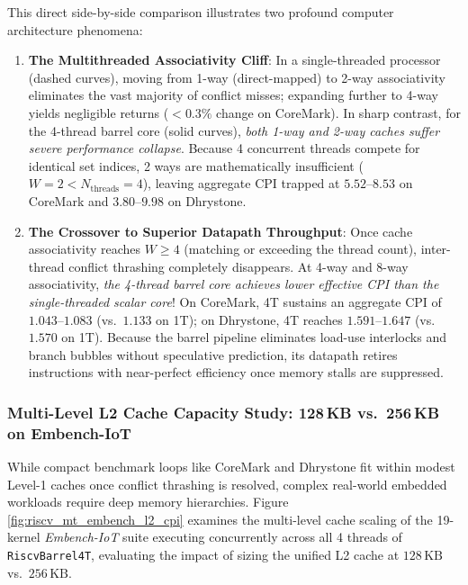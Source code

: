 This direct side-by-side comparison illustrates two profound computer architecture phenomena:
\begin{enumerate}
    \item \textbf{The Multithreaded Associativity Cliff}:
    In a single-threaded processor (dashed curves), moving from 1-way (direct-mapped) to 2-way associativity eliminates the vast majority of conflict misses; expanding further to 4-way yields negligible returns ($<0.3\%$ change on CoreMark). In sharp contrast, for the 4-thread barrel core (solid curves), \textit{both 1-way and 2-way caches suffer severe performance collapse}. Because 4 concurrent threads compete for identical set indices, 2 ways are mathematically insufficient ($W = 2 < N_{\text{threads}} = 4$), leaving aggregate CPI trapped at $5.52\text{--}8.53$ on CoreMark and $3.80\text{--}9.98$ on Dhrystone.
    \item \textbf{The Crossover to Superior Datapath Throughput}:
    Once cache associativity reaches $W \ge 4$ (matching or exceeding the thread count), inter-thread conflict thrashing completely disappears. At 4-way and 8-way associativity, \textit{the 4-thread barrel core achieves lower effective CPI than the single-threaded scalar core}! On CoreMark, 4T sustains an aggregate CPI of $\mathbf{1.043\text{--}1.083}$ (vs.\ $1.133$ on 1T); on Dhrystone, 4T reaches $\mathbf{1.591\text{--}1.647}$ (vs.\ $1.570$ on 1T). Because the barrel pipeline eliminates load-use interlocks and branch bubbles without speculative prediction, its datapath retires instructions with near-perfect efficiency once memory stalls are suppressed.
\end{enumerate}

\subsubsection{Multi-Level L2 Cache Capacity Study: 128\,KB vs.\ 256\,KB on Embench-IoT}

While compact benchmark loops like CoreMark and Dhrystone fit within modest Level-1 caches once conflict thrashing is resolved, complex real-world embedded workloads require deep memory hierarchies. Figure \ref{fig:riscv_mt_embench_l2_cpi} examines the multi-level cache scaling of the 19-kernel \textit{Embench-IoT} suite executing concurrently across all 4 threads of \texttt{RiscvBarrel4T}, evaluating the impact of sizing the unified L2 cache at $128\,\text{KB}$ vs.\ $256\,\text{KB}$.

